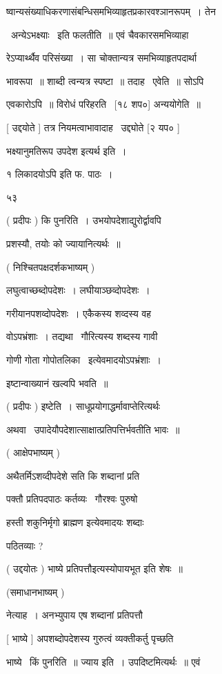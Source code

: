 \documentclass[11pt, openany]{book}
\begin{document}
ष्वान्यसंख्याधिकरणासंबन्धिसमभिव्याहृतप्रकारवश्ञानरूपम्~। तेन 

 \textendash\ अन्येऽभक्ष्याः \textendash\ इति फलतीति~॥ एवं चैवकारसमभिव्याहा \textendash\ 

रेऽप्यार्थ्थैव परिसंख्या~। सा चोक्तान्यत्र समभिव्याहृतपदार्था \textendash\ 

भावरूपा~॥ शाब्दी त्वन्यत्र स्पष्टा~॥ तदाह \textendash\ एवेति~॥ सोऽपि 

एवकारोऽपि~॥ विरोधं परिहरति \textendash\ [१८ शप०] अन्ययोगेति~॥ 

[ उद्दयोते ] तत्र नियमत्वाभावादाह \textendash\ उद्द्योते [२ यप० ] 

भक्ष्यानुमतिरूप उपदेश इत्यर्थ इति~। 

१ {\qt लिकादयोऽपि} इति फ. पाठः~। 

५३ 

( प्रदीपः ) कि पुनरिति~। उभयोपदेशाद्युरोर्द्वावपि 

प्रशस्यौ, तयोः को ज्यायानित्यर्थः~॥ 

( निश्चितपक्षदर्शकभाष्यम् ) 

लघुत्वाच्छब्दोपदेशः~। लघीयाञ्छव्दोपदेशः~। 

गरीयानपशव्दोपदेशः~। एकैकस्य शव्दस्य वह \textendash\ 

वोऽपभ्रंशाः~। तद्यथा \textendash\ गौरित्यस्य शब्दस्य गावी 

गोणी गोता गोपोतलिका \textendash\ इत्येवमादयोऽपभ्रंशाः~। 

इष्टान्वाख्यानं खल्वपि भवति~॥ 

( प्रदीपः ) इष्टेति~। साधूप्रयोगाद्धर्मावाप्तेरित्यर्थः 

अथवा \textendash\ उपादेयौपदेशात्साक्षात्प्रतिपत्तिर्भवतीति भावः~॥ 

( आक्षेपभाष्यम् )

अथैतर्मिऽशव्दीपदेशे सति कि शब्दानां प्रति \textendash\ 

पक्तौ प्रतिपदपाठः कर्तव्यः \textendash\ गौरश्वः पुरुषो 

हस्ती शकुनिर्मृगो ब्राह्मण इत्येवमादयः शब्दाः 

पठितव्याः ? 

( उद्दयोतः ) भाष्ये {\qt प्रतिपत्तौ}इत्यस्योपायभूत इति शेषः~॥ 

(समाधानभाष्यम् ) 

नेत्याह~। अनभ्युपाय एष शब्दानां प्रतिपत्तौ 

[ भाष्ये ] अपशब्दोपदेशस्य गुरुत्वं व्यक्तीकर्तु पृच्छति \textendash\ 

भाष्ये \textendash\ किं पुनरिति~॥ ज्याय इति~। उपदिष्टमित्यर्थः~॥ एवं 
\end{document}
